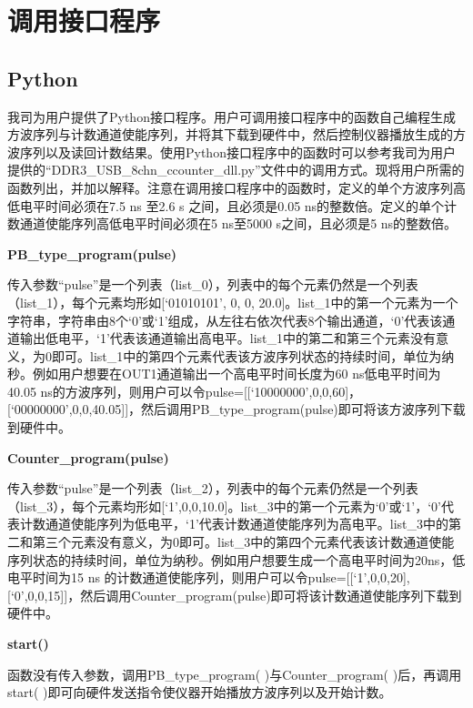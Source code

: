 \chapter{\heiti 调用接口程序}
\section{Python }
我司为用户提供了Python接口程序。用户可调用接口程序中的函数自己编程生成方波序列与计数通道使能序列，并将其下载到硬件中，然后控制仪器播放生成的方波序列以及读回计数结果。使用Python接口程序中的函数时可以参考我司为用户提供的“DDR3\_USB\_8chn\_ccounter\_dll.py”文件中的调用方式。现将用户所需的函数列出，并加以解释。注意在调用接口程序中的函数时，定义的单个方波序列高低电平时间必须在7.5 ns 至2.6 s 之间，且必须是0.05 ns的整数倍。定义的单个计数通道使能序列高低电平时间必须在5 ns至5000 s之间，且必须是5 ns的整数倍。
\vspace{0.4cm}

\noindent\fontsize{12pt}{\baselineskip}\textbf{PB\_type\_program(pulse)}

传入参数“pulse”是一个列表（list\_0），列表中的每个元素仍然是一个列表（list\_1），每个元素均形如[`01010101', 0, 0, 20.0]。list\_1中的第一个元素为一个字符串，字符串由8个‘0’或‘1’组成，从左往右依次代表8个输出通道，‘0’代表该通道输出低电平，‘1’代表该通道输出高电平。list\_1中的第二和第三个元素没有意义，为0即可。list\_1中的第四个元素代表该方波序列状态的持续时间，单位为纳秒。例如用户想要在OUT1通道输出一个高电平时间长度为60 ns低电平时间为40.05 ns的方波序列，则用户可以令pulse=[[`10000000',0,0,60]， [`00000000',0,0,40.05]]，然后调用PB\_type\_program(pulse)即可将该方波序列下载到硬件中。
\vspace{0.4cm}

\noindent\fontsize{12pt}{\baselineskip}\textbf{Counter\_program(pulse)}

传入参数“pulse”是一个列表（list\_2），列表中的每个元素仍然是一个列表（list\_3），每个元素均形如[`1',0,0,10.0]。list\_3中的第一个元素为‘0’或‘1’，‘0’代表计数通道使能序列为低电平，‘1’代表计数通道使能序列为高电平。list\_3中的第二和第三个元素没有意义，为0即可。list\_3中的第四个元素代表该计数通道使能序列状态的持续时间，单位为纳秒。例如用户想要生成一个高电平时间为20ns，低电平时间为15 ns 的计数通道使能序列，则用户可以令pulse=[[`1',0,0,20], [`0',0,0,15]]，然后调用Counter\_program(pulse)即可将该计数通道使能序列下载到硬件中。

\newpage
\noindent\fontsize{12pt}{\baselineskip}\textbf{start()}

函数没有传入参数，调用PB\_type\_program( )与Counter\_program( )后，再调用start( )即可向硬件发送指令使仪器开始播放方波序列以及开始计数。
\vspace{0.4cm}

